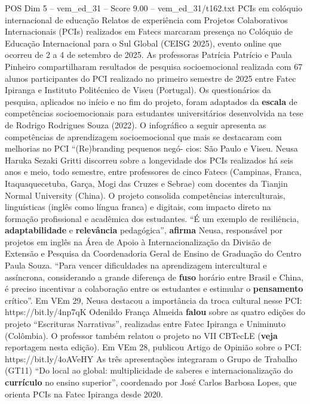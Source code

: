 \begin{textsample}{POS Dim 5 – vem\_ed\_31 – Score 9.00 – vem\_ed\_31/t162.txt}  \label{ex:f5_pos_048}
PCIs em colóquio internacional de educação Relatos de experiência com Projetos Colaborativos Internacionais (PCIs) realizados em Fatecs marcaram presença no Colóquio de Educação Internacional para o Sul Global (CEISG 2025), evento online que ocorreu de 2 a 4 de setembro de 2025.
As professoras Patrícia Patrício e Paula Pinheiro compartilharam resultados de pesquisa socioemocional realizada com 67 alunos participantes do PCI realizado no primeiro semestre de 2025 entre Fatec Ipiranga e Instituto Politécnico de Viseu (Portugal).
Os questionários da pesquisa, aplicados no início e no fim do projeto, foram adaptados da \textbf{escala} de competências socioemocionais para estudantes universitários desenvolvida na tese de Rodrigo Rodrigues Souza (2022).
O infográfico a seguir apresenta as competências de aprendizagem socioemocional que mais se destacaram com melhorias no PCI “(Re)branding pequenos negó- cios: São Paulo e Viseu.
Neusa Haruka Sezaki Gritti discorreu sobre a longevidade dos PCIs realizados há seis anos e meio, todo semestre, entre professores de cinco Fatecs (Campinas, Franca, Itaquaquecetuba, Garça, Mogi das Cruzes e Sebrae) com docentes da Tianjin Normal University (China).
O projeto consolida competências interculturais, linguísticas (inglês como língua franca) e digitais, com impacto direto na formação profissional e acadêmica dos estudantes. “É um exemplo de resiliência, \textbf{adaptabilidade} e \textbf{relevância} pedagógica”, \textbf{afirma} Neusa, responsável por projetos em inglês na Área de Apoio à Internacionalização da Divisão de Extensão e Pesquisa da Coordenadoria Geral de Ensino de Graduação do Centro Paula Souza. “Para vencer dificuldades na aprendizagem intercultural e assíncrona, considerando a grande diferença de \textbf{fuso} horário entre Brasil e China, é preciso incentivar a colaboração entre os estudantes e estimular o \textbf{pensamento} crítico”.
Em VEm 29, Neusa destacou a importância da troca cultural nesse PCI: https://bit.ly/4np7qK Odenildo França Almeida \textbf{falou} sobre as quatro edições do projeto “Escrituras Narrativas”, realizadas entre Fatec Ipiranga e Uniminuto (Colômbia).
O professor também relatou o projeto no VII CBTecLE (\textbf{veja} reportagem nesta edição).
Em VEm 28, publicou Artigo de Opinião sobre o PCI: https://bit.ly/4oAVeHY As três apresentações integraram o Grupo de Trabalho (GT11) “Do local ao global: multiplicidade de saberes e internacionalização do \textbf{currículo} no ensino superior”, coordenado por José Carlos Barbosa Lopes, que orienta PCIs na Fatec Ipiranga desde 2020.

\end{textsample}
